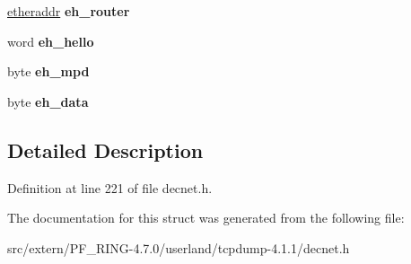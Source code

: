 \begin{DoxyCompactItemize}
\item 
\hypertarget{structehellomsg_a6f8342574b3ca26e61c589086731b5c9}{
\hyperlink{unionetheraddress}{etheraddr} {\bfseries eh\_\-router}}
\label{structehellomsg_a6f8342574b3ca26e61c589086731b5c9}

\item 
\hypertarget{structehellomsg_a946dd6bf140cd9c1f62466a6b19e3857}{
word {\bfseries eh\_\-hello}}
\label{structehellomsg_a946dd6bf140cd9c1f62466a6b19e3857}

\item 
\hypertarget{structehellomsg_aeb95c35ba5aa51881e55c549c9049505}{
byte {\bfseries eh\_\-mpd}}
\label{structehellomsg_aeb95c35ba5aa51881e55c549c9049505}

\item 
\hypertarget{structehellomsg_adfa33b7586d392f85bdf49db6b8bece6}{
byte {\bfseries eh\_\-data}}
\label{structehellomsg_adfa33b7586d392f85bdf49db6b8bece6}

\end{DoxyCompactItemize}


\subsection{Detailed Description}


Definition at line 221 of file decnet.h.



The documentation for this struct was generated from the following file:\begin{DoxyCompactItemize}
\item 
src/extern/PF\_\-RING-\/4.7.0/userland/tcpdump-\/4.1.1/decnet.h\end{DoxyCompactItemize}
